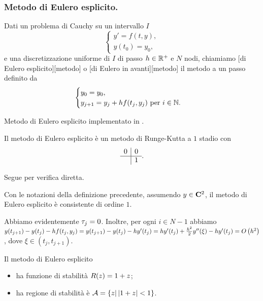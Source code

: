\subsubsection{Metodo di Eulero esplicito.}
\label{MetodiNumericiPerEquazioniDifferenzialiOrdinarie_MetodoDiEuleroEsplicito}
\begin{Definition}
	Dati un problema di Cauchy su un intervallo $I$
	\[
	\begin{cases}
		y' = f(t,y),\\
		y(t_0) = y_0,
	\end{cases}
	\]
	e una discretizzazione uniforme di $I$ di passo $h \in \mathbb{R}^+$ e $N$ nodi, chiamiamo [di Eulero esplicito][metodo] o [di Eulero in avanti][metodo] il metodo a un passo definito da
	\[
	\begin{cases}
		y_0 = y_0,\\
		y_{j + 1} = y_j + h f(t_j,y_j)\text{ per }i \in \mathbb{N}.
	\end{cases}
	\]
\end{Definition}
\begin{listing}
	\caption{Metodo di Eulero esplicito implementato in .}
\end{listing}
\begin{Theorem}
	Il metodo di Eulero esplicito \`e un metodo di Runge-Kutta a $1$ stadio con \tableau
	\[
	\begin{array}{c|c}
	0	&	0\\
	\hline
		&	1
	\end{array}.
	\]
\end{Theorem}
\Proof Segue per verifica diretta. \EndProof
\begin{Theorem}
	Con le notazioni della definizione precedente, assumendo $y \in \CClass{2}$, il metodo di Eulero esplicito \`e consistente di ordine $1$.
\end{Theorem}
\Proof Abbiamo evidentemente $\tau_j = 0$. Inoltre, per ogni $i \in N - 1$ abbiamo $y(t_{j + 1}) - y(t_j) - h f(t_j,y_j) = y(t_{j + 1}) - y(t_j) - h y'(t_j) = h y'(t_j) + \frac{h^2}{2} y''(\xi) - h y'(t_j) = O \left ( h^2 \right )$, dove $\xi \in (t_j,t_{j + 1})$. \EndProof
\begin{Theorem}
	Il metodo di Eulero esplicito
	\begin{itemize}
		\item ha funzione di stabilit\`a $R(z) = 1 + z$;
		\item ha regione di stabilit\`a \`e $\mathcal{A} = \lbrace z | \left \lvert 1 + z \right \rvert < 1 \rbrace$.
	\end{itemize}
\end{Theorem}
